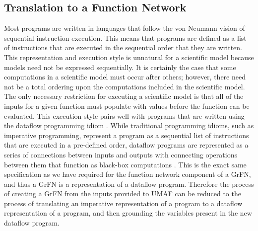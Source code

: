 \subsection{Translation to a Function Network \label{sec:translation_func_net}}
Most programs are written in languages that follow the von Neumann vision of sequential instruction execution.
This means that programs are defined as a list of instructions that are executed in the sequential order that they are written.
This representation and execution style is unnatural for a scientific model because models need not be expressed sequentially.
It is certainly the case that some computations in a scientific model must occur after others; however, there need not be a total ordering upon the computations included in the scientific model.
The only necessary restriction for executing a scientific model is that all of the inputs for a given function must populate with values before the function can be evaluated.
This execution style pairs well with programs that are written using the dataflow programming idiom \citep{johnston2004dataflowadvances}.
While traditional programming idioms, such as imperative programming, represent a program as a sequential list of instructions that are executed in a pre-defined order, dataflow programs are represented as a series of connections between inputs and outputs with connecting operations between them that function as black-box computations \citep{wadge1985lucid}.
This is the exact same specification as we have required for the function network component of a GrFN, and thus a GrFN is a representation of a dataflow program.
Therefore the process of creating a GrFN from the inputs provided to UMAF can be reduced to the process of translating an imperative representation of a program to a dataflow representation of a program, and then grounding the variables present in the new dataflow program.

